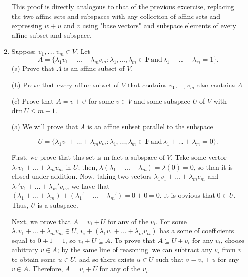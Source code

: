 \documentclass{book}
\begin{document}
\begin{enumerate}
This proof is directly analogous to that of the previous excercise, replacing the two affine sets and subspaces with any collection of affine sets and expressing \(w+u\) and \(v\) using "base vectors" and subspace elements of every affine subset and subspace.

\item Suppose \(v_1,\dots,v_m \in V\).  Let \[A=\{\lambda_1v_1+\dots+\lambda_mv_m: \lambda_1,\dots,\lambda_m \in \textbf{F} \, \textrm{and} \, \lambda_1+\dots+\lambda_m=1\}.\] (a) Prove that \(A\) is an affine subset of \(V\).

(b) Prove that every affine subset of \(V\) that contains \(v_1,\dots,v_m\) also contains \(A\).

(c) Prove that \(A=v+U\) for some \(v \in V\) and some subspace \(U\) of \(V\) with \(\textrm{dim} \, U \leq m-1\).

(a) We will prove that \(A\) is an affine subset parallel to the subspace

\begin{equation*}
    U=\{\lambda_1v_1+\dots+\lambda_mv_m: \lambda_1,\dots,\lambda_m \in \textbf{F} \, \textrm{and} \, \lambda_1+\dots+\lambda_m=0\}.
\end{equation*}

First, we prove that this set is in fact a subspace of \(V\).  Take some vector \(\lambda_1v_1+\dots+\lambda_mv_m\) in \(U\); then, \(\lambda(\lambda_1+\dots+\lambda_m)=\lambda(0)=0\), so then it is closed under addition.  Now, taking two vectors \(\lambda_1v_1+\dots+\lambda_mv_m\) and \(\lambda_1'v_1+\dots+\lambda_m'v_m\), we have that \((\lambda_1+\dots+\lambda_m)+(\lambda_1'+\dots+\lambda_m')=0+0=0\).  It is obvious that \(0 \in U\).  Thus, \(U\) is a subspace.

Next, we prove that \(A=v_i+U\) for any of the \(v_i\).  For some \(\lambda_1v_1+\dots+\lambda_mv_m \in U\), \(v_i+(\lambda_1v_1+\dots+\lambda_mv_m)\) has a some of coefficients equal to \(0+1=1\), so \(v_i+U \subseteq A\).  To prove that \(A \subseteq U+v_i\) for any \(v_i\), choose arbitrary \(v \in A\); by the same line of reasoning, we can subtract any \(v_i\) from \(v\) to obtain some \(u \in U\), and so there exists \(u \in U\) such that \(v=v_i+u\) for any \(v \in A\).  Therefore, \(A=v_i+U\) for any of the \(v_i\).


\end{enumerate}
\end{document}
